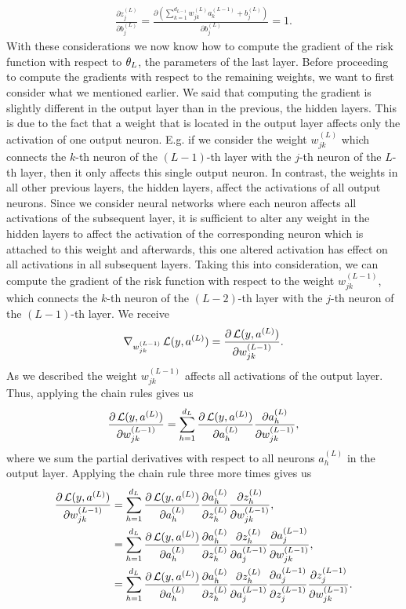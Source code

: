 \begin{align*}
\frac{\partial z_{j}^{(L)}}{\partial b^{(L)}_{j}} = \frac{\partial \left(\sum_{k=1}^{d_{L-1}} w^{(L)}_{jk} a_{k}^{(L-1)} + b_j^{(L)}\right)}{\partial b^{(L)}_{j}} = 1.
\end{align*}
With these considerations we now know how to compute the gradient of the risk function with respect to $\theta_L$, the parameters of the last layer. Before proceeding to compute the gradients with respect to the remaining weights, we want to first consider what we mentioned earlier. We said that computing the gradient is slightly different in the output layer than in the previous, the hidden layers. This is due to the fact that a weight that is located in the output layer affects only the activation of one output neuron. E.g. if we consider the weight $w_{jk}^{(L)}$ which connects the $k$-th neuron of the $(L-1)$-th layer with the $j$-th neuron of the $L$-th layer, then it only affects this single output neuron. In contrast, the weights in all other previous layers, the hidden layers, affect the activations of all output neurons. Since we consider neural networks where each neuron affects all activations of the subsequent layer, it is sufficient to alter any weight in the hidden layers to affect the activation of the corresponding neuron which is attached to this weight and afterwards, this one altered activation has effect on all activations in all subsequent layers. Taking this into consideration, we can compute the gradient of the risk function with respect to the weight $w_{jk}^{(L-1)}$, which connects the $k$-th neuron of the $(L-2)$-th layer with the $j$-th neuron of the $(L-1)$-th layer. We receive
\begin{align*}
\nabla_{w^{(L-1)}_{jk}} \operatorname{\mathcal{L}}(y, a^{(L)}) = \frac{\partial \operatorname{\mathcal{L}}(y, a^{(L)})}{\partial w^{(L-1)}_{jk}}.
\end{align*}
As we described the weight $w^{(L-1)}_{jk}$ affects all activations of the output layer. Thus, applying the chain rules gives us
\begin{align*}
\frac{\partial \operatorname{\mathcal{L}}(y, a^{(L)})}{\partial w^{(L-1)}_{jk}} = \sum_{h=1}^{d_L}\frac{\partial \operatorname{\mathcal{L}}(y, a^{(L)})}{\partial a_h^{(L)}} \frac{\partial a_h^{(L)}}{\partial w^{(L-1)}_{jk}},
\end{align*}
where we sum the partial derivatives with respect to all neurons $a_h^{(L)}$ in the output layer. Applying the chain rule three more times gives us
\begin{align*}
\frac{\partial \operatorname{\mathcal{L}}(y, a^{(L)})}{\partial w^{(L-1)}_{jk}} &= \sum_{h=1}^{d_L}\frac{\partial \operatorname{\mathcal{L}}(y, a^{(L)})}{\partial a_h^{(L)}} \frac{\partial a_h^{(L)}}{\partial z_h^{(L)}} \frac{\partial z_h^{(L)}}{\partial w^{(L-1)}_{jk}},\\
&= \sum_{h=1}^{d_L}\frac{\partial \operatorname{\mathcal{L}}(y, a^{(L)})}{\partial a_h^{(L)}} \frac{\partial a_h^{(L)}}{\partial z_h^{(L)}} \frac{\partial z_h^{(L)}}{\partial a_j^{(L-1)}} \frac{\partial a_j^{(L-1)}}{\partial w^{(L-1)}_{jk}},\\
&= \sum_{h=1}^{d_L}\frac{\partial \operatorname{\mathcal{L}}(y, a^{(L)})}{\partial a_h^{(L)}} \frac{\partial a_h^{(L)}}{\partial z_h^{(L)}} \frac{\partial z_h^{(L)}}{\partial a_j^{(L-1)}} \frac{\partial a_j^{(L-1)}}{\partial z_j^{(L-1)}} \frac{\partial z_j^{(L-1)}}{\partial w^{(L-1)}_{jk}}.
\end{align*}
